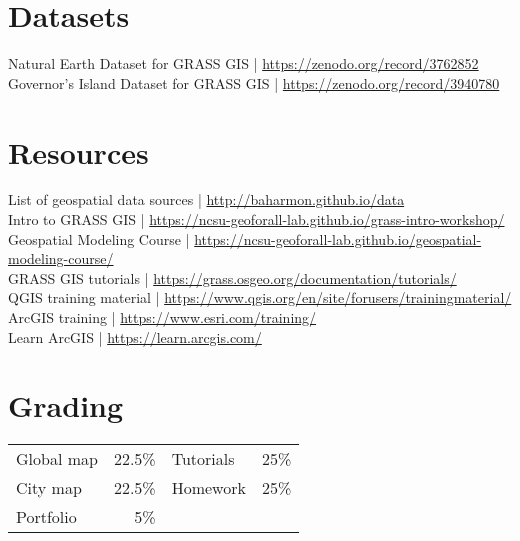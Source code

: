 \documentclass[11pt,article,oneside]{memoir}
\begin{document}
\section{Datasets}
Natural Earth Dataset for GRASS GIS | \url{https://zenodo.org/record/3762852}\\
Governor's Island Dataset for GRASS GIS | \url{https://zenodo.org/record/3940780}\\


\section{Resources}
List of geospatial data sources | \url{http://baharmon.github.io/data}\\
Intro to GRASS GIS | \url{https://ncsu-geoforall-lab.github.io/grass-intro-workshop/}\\
Geospatial Modeling Course | \url{https://ncsu-geoforall-lab.github.io/geospatial-modeling-course/}\\
GRASS GIS tutorials | \url{https://grass.osgeo.org/documentation/tutorials/}\\
QGIS training material | \url{https://www.qgis.org/en/site/forusers/trainingmaterial/}\\
ArcGIS training | \url{https://www.esri.com/training/}\\
Learn ArcGIS | \url{https://learn.arcgis.com/}\\

\section{Grading}
%
\begin{table}[H]
\begin{tabular}{l r @{\hskip 2cm} l @{\hskip 0.5cm} l}
%
Global map & 22.5\% & Tutorials & 25\% \\
City map & 22.5\% & Homework & 25\% \\
Portfolio & 5\% \\
%
\end{tabular}
\end{table}
\end{document}
